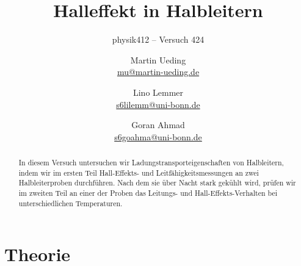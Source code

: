 


\usepackage[section]{placeins}
\usepackage{booktabs}
\usepackage{pdflscape}

\newcommand\versuchsnummer{424}
\DeclareMathOperator\std{std}

\newcommand\erklaerungFehlerNotation{%
    In dieser Notation bedeutet \num{1.234 +- 0.005}, dass der Wert
    $\num{1.234} \pm \num{0.005}$ ist. Die Ziffern in Klammern sind die
    Fehlerangabe. Um den Fehler zu erhalten, wird diese von rechts über die
    Zahl gelegt, alle anderen Stellen werden auf 0 gesetzt.
}

\ihead{physik412 – Versuch \versuchsnummer}

\subject{Praktikumsprotokoll}
\title{Halleffekt in Halbleitern}
\subtitle{physik412 – Versuch \versuchsnummer}
\author{
    Martin Ueding \\
    \small{\href{mailto:mu@martin-ueding.de}{mu@martin-ueding.de}}
    \and
    Lino Lemmer \\
    \small{\href{mailto:s6lilemm@uni-bonn.de}{s6lilemm@uni-bonn.de}}
    \and
    Goran Ahmad \\
    \small{\href{mailto:s6goahma@uni-bonn.de}{s6goahma@uni-bonn.de}}
}
\publishers{Tutor: Christian Hammann}

\setcounter{secnumdepth}{4}
\setcounter{tocdepth}{3}



\maketitle

\begin{abstract}
    In diesem Versuch untersuchen wir Ladungstransporteigenschaften von
    Halbleitern, indem wir im ersten Teil Hall-Effekts- und
    Leitfähigkeitsmessungen an zwei Halbleiterproben durchführen. Nach dem sie
    über Nacht stark gekühlt wird, prüfen wir im zweiten Teil an einer der
    Proben das Leitungs- und Hall-Effekts-Verhalten bei unterschiedlichen
    Temperaturen.
\end{abstract}

\tableofcontents

\newcommand\probeA{InAs~HF-540}
\newcommand\probeB{InAs~HF-301-040}

\chapter{Theorie}

